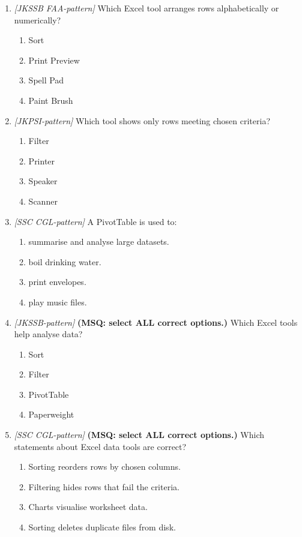 \documentclass[11pt]{article}
\begin{document}
\begin{enumerate}[label=\textbf{Q\arabic*.}, leftmargin=*]
\item \textit{[JKSSB FAA-pattern]} Which Excel tool arranges rows alphabetically or numerically?
  \begin{enumerate}[label=\Alph*.]
    \item Sort
    \item Print Preview
    \item Spell Pad
    \item Paint Brush
  \end{enumerate}
\item \textit{[JKPSI-pattern]} Which tool shows only rows meeting chosen criteria?
  \begin{enumerate}[label=\Alph*.]
    \item Filter
    \item Printer
    \item Speaker
    \item Scanner
  \end{enumerate}
\item \textit{[SSC CGL-pattern]} A PivotTable is used to:
  \begin{enumerate}[label=\Alph*.]
    \item summarise and analyse large datasets.
    \item boil drinking water.
    \item print envelopes.
    \item play music files.
  \end{enumerate}
\item \textit{[JKSSB-pattern]} \textbf{(MSQ: select ALL correct options.)} Which Excel tools help analyse data?
  \begin{enumerate}[label=\Alph*.]
    \item Sort
    \item Filter
    \item PivotTable
    \item Paperweight
  \end{enumerate}
\item \textit{[SSC CGL-pattern]} \textbf{(MSQ: select ALL correct options.)} Which statements about Excel data tools are correct?
  \begin{enumerate}[label=\Alph*.]
    \item Sorting reorders rows by chosen columns.
    \item Filtering hides rows that fail the criteria.
    \item Charts visualise worksheet data.
    \item Sorting deletes duplicate files from disk.
  \end{enumerate}
\end{enumerate}
\def\JKSSBLessonID{27}\def\JKSSBAnswers{0}
\end{document}
